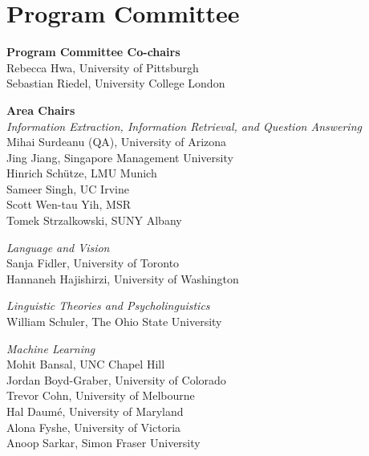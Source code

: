 
\clearpage
\section{Program Committee}
\setlength{\parindent}{0pt}

\vspace*{0.5cm}

{\bf Program Committee Co-chairs} \\
Rebecca Hwa, University of Pittsburgh \\
Sebastian Riedel, University College London

{\bf Area Chairs} \\
\emph{Information Extraction, Information Retrieval, and Question Answering} \\
\hspace*{0.2in} Mihai Surdeanu (QA), University of Arizona \\
\hspace*{0.2in} Jing Jiang, Singapore Management University \\
\hspace*{0.2in} Hinrich Schütze, LMU Munich \\
\hspace*{0.2in} Sameer Singh, UC Irvine \\
\hspace*{0.2in} Scott Wen-tau Yih, MSR \\
\hspace*{0.2in} Tomek Strzalkowski, SUNY Albany

\emph{Language and Vision} \\
\hspace*{0.2in} Sanja Fidler, University of Toronto \\
\hspace*{0.2in} Hannaneh Hajishirzi, University of Washington


\emph{Linguistic Theories and Psycholinguistics} \\
\hspace*{0.2in} William Schuler, The Ohio State University

\emph{Machine Learning} \\
\hspace*{0.2in} Mohit Bansal, UNC Chapel Hill \\
\hspace*{0.2in} Jordan Boyd-Graber, University of Colorado \\
\hspace*{0.2in} Trevor Cohn, University of Melbourne\\
\hspace*{0.2in} Hal Daumé, University of Maryland \\
\hspace*{0.2in} Alona Fyshe, University of Victoria \\
\hspace*{0.2in} Anoop Sarkar, Simon Fraser University



